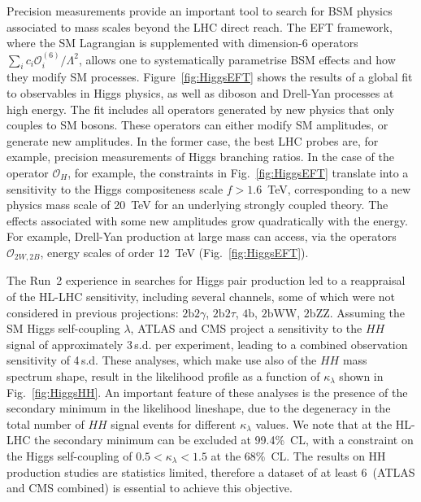\documentclass[../report.tex]{subfiles}
\begin{document}
Precision measurements provide an important tool to search for BSM physics associated to mass scales beyond the LHC direct reach. The EFT framework, where the SM Lagrangian is supplemented with dimension-6 operators $\sum_{i} c_i \mathcal{O}^{(6)}_i/\Lambda^2$, allows one to systematically parametrise BSM effects and how they modify SM processes. Figure~\ref{fig:HiggsEFT}  shows the results of a global fit  to observables in Higgs physics, as well as diboson and Drell-Yan processes at high energy. The fit includes all operators generated by new physics that only couples to SM bosons. These operators can either modify SM amplitudes, or generate new amplitudes. In the former case, the best LHC probes are, for example, precision measurements of Higgs branching ratios. In the case of the operator $\mathcal{O}_H$, 
for example, the constraints in Fig.~\ref{fig:HiggsEFT} translate into a sensitivity to the Higgs compositeness scale $f>1.6$~TeV, corresponding to a new physics mass scale of 20~TeV for an underlying strongly coupled theory.
The effects associated with some new amplitudes grow quadratically with the energy. For example, Drell-Yan production at large mass can access, via the operators $\mathcal{O}_{2W,2B}$, energy scales of order 12~TeV (Fig.~\ref{fig:HiggsEFT}). 

The Run~2 experience in searches for Higgs pair production led to a reappraisal of the HL-LHC sensitivity, including several channels, some of which were not considered in previous projections: $2\textrm{b}2\gamma$, $2\textrm{b}2\tau$, $4\textrm{b}$, $2\textrm{b}\textrm{WW}$, $2\textrm{b}\textrm{ZZ}$.
Assuming the SM Higgs self-coupling $\lambda$, ATLAS and CMS project a sensitivity to the $HH$ signal of approximately 3\,s.d. per experiment, leading to a combined observation sensitivity of 4\,s.d. These analyses, which make use also of the $HH$ mass spectrum shape, result in the likelihood profile as a function of $\kappa_{\lambda}$ shown in Fig.~\ref{fig:HiggsHH}. An important feature of these analyses is the presence of the secondary minimum in the likelihood lineshape, due to the degeneracy in the total number of $HH$ signal events for different $\kappa_{\lambda}$ values. We note that at the HL-LHC the secondary minimum can be excluded at 99.4\%~CL, with a constraint on the Higgs self-coupling of $0.5 < \kappa_{\lambda} < 1.5 $ at the 68\%\ CL. The results on HH production studies are statistics limited, therefore a dataset of at least 6\,\iab{}  (ATLAS and CMS combined) is essential to achieve this objective.
\end{document}
